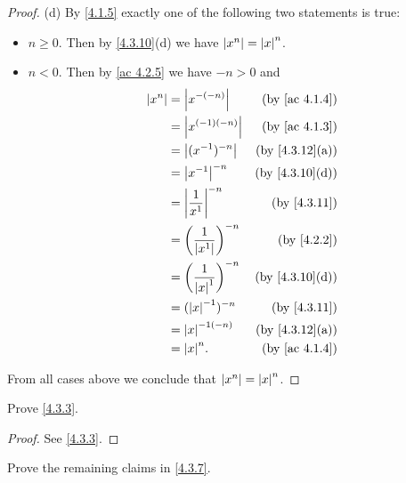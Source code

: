 \begin{proof}{(d)}
  By \cref{4.1.5} exactly one of the following two statements is true:
  \begin{itemize}
    \item \(n \geq 0\).
          Then by \cref{4.3.10}(d) we have \(\left\lvert x^n\right\rvert = \left\lvert x\right\rvert^n\).
    \item \(n < 0\).
          Then by \cref{ac 4.2.5} we have \(-n > 0\) and
          \begin{align*}
            \abs{x^n} & = \abs{x^{-(-n)}}                      & \text{(by \cref{ac 4.1.4})}  \\
                      & = \abs{x^{(-1)(-n)}}                   & \text{(by \cref{ac 4.1.3})}  \\
                      & = \abs{(x^{-1})^{-n}}                  & \text{(by \cref{4.3.12}(a))} \\
                      & = \abs{x^{-1}}^{-n}                    & \text{(by \cref{4.3.10}(d))} \\
                      & = \abs{\frac{1}{x^1}}^{-n}             & \text{(by \cref{4.3.11})}    \\
                      & = \bigg(\frac{1}{\abs{x^1}}\bigg)^{-n} & \text{(by \cref{4.2.2})}     \\
                      & = \bigg(\frac{1}{\abs{x}^1}\bigg)^{-n} & \text{(by \cref{4.3.10}(d))} \\
                      & = (\abs{x}^{-1})^{-n}                  & \text{(by \cref{4.3.11})}    \\
                      & = \abs{x}^{-1(-n)}                     & \text{(by \cref{4.3.12}(a))} \\
                      & = \abs{x}^n.                           & \text{(by \cref{ac 4.1.4})}
          \end{align*}
  \end{itemize}
  From all cases above we conclude that \(\left\lvert x^n\right\rvert = \left\lvert x\right\rvert^n\).
\end{proof}

\exercisesection

\begin{exercise}\label{ex 4.3.1}
  Prove \cref{4.3.3}.
\end{exercise}

\begin{proof}
  See \cref{4.3.3}.
\end{proof}

\begin{exercise}\label{ex 4.3.2}
  Prove the remaining claims in \cref{4.3.7}.
\end{exercise}

